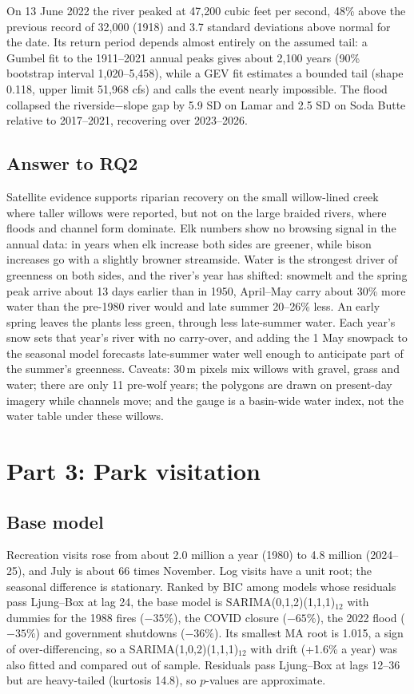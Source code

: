 \documentclass[11pt,a4paper]{article}
\begin{document}
On 13 June 2022 the river peaked at 47{,}200 cubic feet per second, 48\% above the previous record of 32{,}000 (1918) and 3.7 standard deviations above normal for the date. Its return period depends almost entirely on the assumed tail: a Gumbel fit to the 1911--2021 annual peaks gives about 2{,}100 years (90\% bootstrap interval 1{,}020--5{,}458), while a GEV fit estimates a bounded tail (shape 0.118, upper limit 51{,}968 cfs) and calls the event nearly impossible. The flood collapsed the riverside$-$slope gap by 5.9 SD on Lamar and 2.5 SD on Soda Butte relative to 2017--2021, recovering over 2023--2026.

\subsection{Answer to RQ2}
Satellite evidence supports riparian recovery on the small willow-lined creek where taller willows were reported, but not on the large braided rivers, where floods and channel form dominate. Elk numbers show no browsing signal in the annual data: in years when elk increase both sides are greener, while bison increases go with a slightly browner streamside. Water is the strongest driver of greenness on both sides, and the river's year has shifted: snowmelt and the spring peak arrive about 13 days earlier than in 1950, April--May carry about 30\% more water than the pre-1980 river would and late summer 20--26\% less. An early spring leaves the plants less green, through less late-summer water. Each year's snow sets that year's river with no carry-over, and adding the 1 May snowpack to the seasonal model forecasts late-summer water well enough to anticipate part of the summer's greenness. Caveats: 30\,m pixels mix willows with gravel, grass and water; there are only 11 pre-wolf years; the polygons are drawn on present-day imagery while channels move; and the gauge is a basin-wide water index, not the water table under these willows.

\section{Part 3: Park visitation}
\subsection{Base model}
Recreation visits rose from about 2.0 million a year (1980) to 4.8 million (2024--25), and July is about 66 times November. Log visits have a unit root; the seasonal difference is stationary. Ranked by BIC among models whose residuals pass Ljung--Box at lag 24, the base model is SARIMA(0,1,2)(1,1,1)$_{12}$ with dummies for the 1988 fires ($-35\%$), the COVID closure ($-65\%$), the 2022 flood ($-35\%$) and government shutdowns ($-36\%$). Its smallest MA root is 1.015, a sign of over-differencing, so a SARIMA(1,0,2)(1,1,1)$_{12}$ with drift (+1.6\% a year) was also fitted and compared out of sample. Residuals pass Ljung--Box at lags 12--36 but are heavy-tailed (kurtosis 14.8), so $p$-values are approximate.
\end{document}
